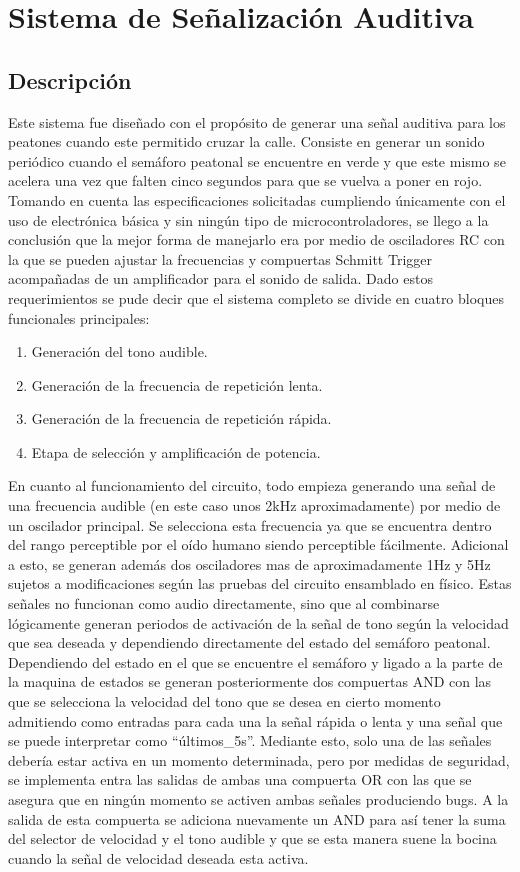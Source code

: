 \documentclass[12pt, journal, onecolumn]{IEEEtran}
\begin{document}
\section{Sistema de Señalización Auditiva}

\subsection{Descripción}
Este sistema fue diseñado con el propósito de generar una señal auditiva para los peatones cuando este permitido cruzar la calle. Consiste en generar un sonido periódico cuando el semáforo peatonal se encuentre en verde y que este mismo se acelera una vez que falten cinco segundos para que se vuelva a poner en rojo. 
Tomando en cuenta las especificaciones solicitadas cumpliendo únicamente con el uso de electrónica básica y sin ningún tipo de microcontroladores, se llego a la conclusión que la mejor forma de manejarlo era por medio de osciladores RC con la que se pueden ajustar la frecuencias y compuertas Schmitt Trigger acompañadas de un amplificador para el sonido de salida.
Dado estos requerimientos se pude decir que el sistema completo se divide en cuatro bloques funcionales principales:
\begin{enumerate}
    \item Generación del tono audible.
    \item Generación de la frecuencia de repetición lenta.
    \item Generación de la frecuencia de repetición rápida.
    \item Etapa de selección y amplificación de potencia.
\end{enumerate}
En cuanto al funcionamiento del circuito, todo empieza generando una señal de una frecuencia audible (en este caso unos 2kHz aproximadamente) por medio de un oscilador principal. Se selecciona esta frecuencia ya que se encuentra dentro del rango perceptible por el oído humano siendo perceptible fácilmente.
Adicional a esto, se generan además dos osciladores mas de aproximadamente 1Hz y 5Hz sujetos a modificaciones según las pruebas del circuito ensamblado en físico. Estas señales no funcionan como audio directamente, sino que al combinarse lógicamente generan periodos de activación de la señal de tono según la velocidad que sea deseada y dependiendo directamente del estado del semáforo peatonal.
Dependiendo del estado en el que se encuentre el semáforo y ligado a la parte de la maquina de estados se generan posteriormente dos compuertas AND con las que se selecciona la velocidad del tono que se desea en cierto momento admitiendo como entradas para cada una la señal rápida o lenta y una señal que se puede interpretar como “últimos_5s”. Mediante esto, solo una de las señales debería estar activa en un momento determinada, pero por medidas de seguridad, se implementa entra las salidas de ambas una compuerta OR con las que se asegura que en ningún momento se activen ambas señales produciendo bugs. A la salida de esta compuerta se adiciona nuevamente un AND para así tener la suma del selector de velocidad y el tono audible y que se esta manera suene la bocina cuando la señal de velocidad deseada esta activa.
\end{document}
